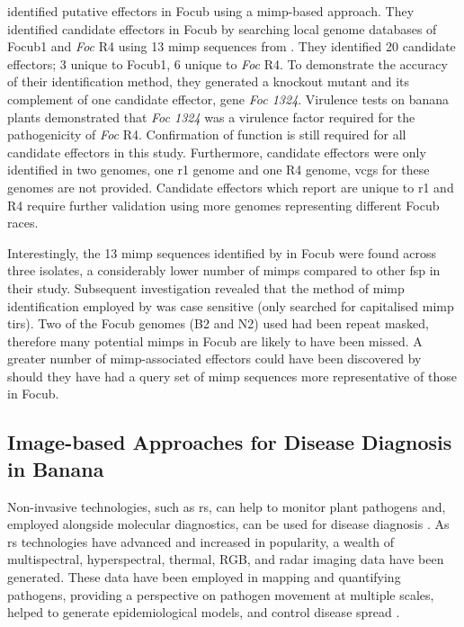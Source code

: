 \textcite{Chang2020} identified putative effectors in \ac{Focub} using a \ac{mimp}-based approach. They identified candidate effectors in \ac{Focub} by searching local genome databases of \ac{Focub1} and \textit{Foc} R4 using 13 \ac{mimp} sequences from \textcite{Dam2016}. They identified 20 candidate effectors; 3 unique to \ac{Focub1}, 6 unique to \textit{Foc} R4. To demonstrate the accuracy of their identification method, they generated a knockout mutant and its complement of one candidate effector, gene \textit{Foc 1324}. Virulence tests on banana plants demonstrated that \textit{Foc 1324} was a virulence factor required for the pathogenicity of \textit{Foc} R4. Confirmation of function is still required for all candidate effectors in this study. Furthermore, candidate effectors were only identified in two genomes, one \ac{r1} genome and one R4 genome, \acp{vcg} for these genomes are not provided. Candidate effectors which \textcite{Chang2020} report are unique to \ac{r1} and R4 require further validation using more genomes representing different \ac{Focub} races.

Interestingly, the 13 mimp sequences identified by \textcite{Dam2016} in \ac{Focub} were found across three isolates, a considerably lower number of \acp{mimp} compared to other \ac{fsp} in their study. Subsequent investigation revealed that the method of \ac{mimp} identification employed by \textcite{Dam2016} was case sensitive (only searched for capitalised \ac{mimp} \acp{tir}). Two of the \ac{Focub} genomes (B2 and N2) used had been repeat masked, therefore many potential \acp{mimp} in \ac{Focub} are likely to have been missed. A greater number of \ac{mimp}-associated effectors could have been discovered by \textcite{Chang2020} should they have had a query set of \ac{mimp} sequences more representative of those in \ac{Focub}.

\subsection{Image-based Approaches for Disease Diagnosis in Banana}
 
 Non-invasive technologies, such as \ac{rs}, can help to monitor plant pathogens and, employed alongside molecular diagnostics, can be used for disease diagnosis \parencite{West2010}. As \ac{rs} technologies have advanced and increased in popularity, a wealth of multispectral, hyperspectral, thermal, RGB, and radar imaging data have been generated. These data have been employed in mapping and quantifying pathogens, providing a perspective on pathogen movement at multiple scales, helped to generate epidemiological models, and control disease spread \parencite{Zhang2019}.

